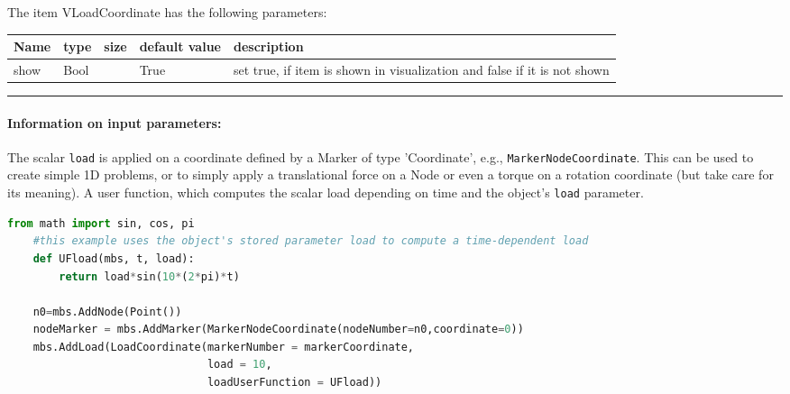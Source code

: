 \noindent The item VLoadCoordinate has the following parameters:
\begin{center}
  \footnotesize
  \begin{longtable}{| p{4.5cm} | p{2.5cm} | p{0.5cm} | p{2.5cm} | p{6cm} |}
    \hline
    \bf Name & \bf type & \bf size & \bf default value & \bf description \\ \hline
    show &     Bool &      &     True &     set true, if item is shown in visualization and false if it is not shown\\ \hline
\end{longtable}
\end{center}
\par\noindent\rule{\textwidth}{0.4pt}
\label{description_LoadCoordinate}
\paragraph{Information on input parameters:} 
\finishTable
 \noindent
    The scalar \texttt{load} is applied on a coordinate defined by a Marker of type 'Coordinate', e.g., \texttt{MarkerNodeCoordinate}.
    This can be used to create simple 1D problems, or to simply apply a translational force on a Node or even a torque
    on a rotation coordinate (but take care for its meaning).
    A user function, which computes the scalar load depending on time and the object's \texttt{load} parameter.
    \finishTable
    \userFunctionExample{}
    \pythonstyle
    \begin{lstlisting}[language=Python]
    from math import sin, cos, pi
    #this example uses the object's stored parameter load to compute a time-dependent load
    def UFload(mbs, t, load): 
        return load*sin(10*(2*pi)*t)

    n0=mbs.AddNode(Point())
    nodeMarker = mbs.AddMarker(MarkerNodeCoordinate(nodeNumber=n0,coordinate=0))
    mbs.AddLoad(LoadCoordinate(markerNumber = markerCoordinate,
                               load = 10,
                               loadUserFunction = UFload))
    \end{lstlisting}
